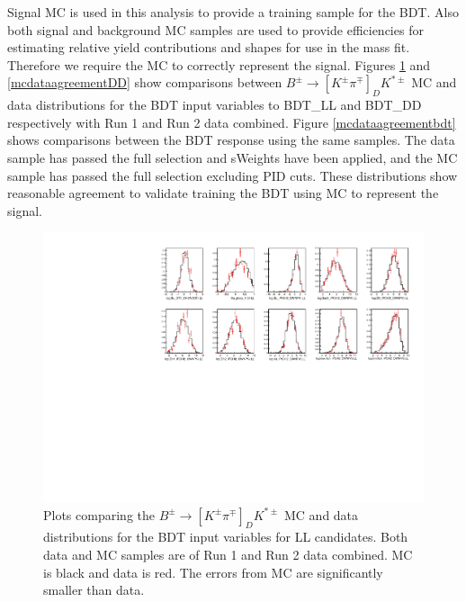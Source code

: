 Signal MC is used in this analysis to provide a training sample for the BDT. Also both signal and background MC samples are used to provide efficiencies for estimating relative yield contributions and shapes for use in the mass fit. Therefore we require the MC to correctly represent the signal. Figures \ref{mcdataagreementLL} and \ref{mcdataagreementDD} show comparisons between $B^{\pm} \to [K^{\pm}\pi^{\mp}]_D K^{*\pm}$ MC and data distributions for the BDT input variables to BDT\_LL and BDT\_DD respectively with Run 1 and Run 2 data combined. Figure \ref{mcdataagreementbdt} shows comparisons between the BDT response using the same samples. The data sample has passed the full selection and sWeights have been applied, and the MC sample has passed the full selection excluding PID cuts. These distributions show reasonable agreement to validate training the BDT using MC to represent the signal.

\begin{figure}[h]
\includegraphics[width=\linewidth]{figures/compareMC/MCdataAgreement_LL.pdf}
\caption{Plots comparing the $B^{\pm} \to [K^{\pm}\pi^{\mp}]_D K^{*\pm}$ MC and data distributions for the BDT input variables for LL candidates. Both data and MC samples are of Run 1 and Run 2 data combined. MC is black and data is red. The errors from MC are significantly smaller than data.}
\label{mcdataagreementLL}
\end{figure}

